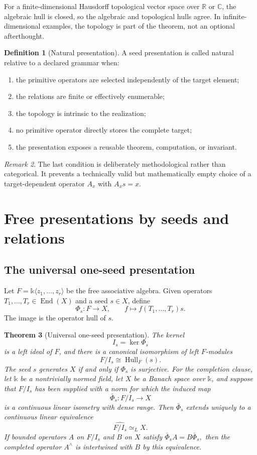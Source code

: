 \documentclass[11pt]{article}
\newtheorem{theorem}{Theorem}[section]
\theoremstyle{definition}
\newtheorem{definition}[theorem]{Definition}
\theoremstyle{remark}
\newtheorem{remark}[theorem]{Remark}
\newcommand{\Hull}{\operatorname{Hull}}
\newcommand{\End}{\operatorname{End}}
\newcommand{\bbk}{\mathbb{k}}
\newcommand{\C}{\mathbb C}
\newcommand{\R}{\mathbb R}
\begin{document}
For a finite-dimensional Hausdorff topological vector space over $\R$ or $\C$, the algebraic hull is closed, so the algebraic and topological hulls agree. In infinite-dimensional examples, the topology is part of the theorem, not an optional afterthought.

\begin{definition}[Natural presentation]
A seed presentation is called natural relative to a declared grammar when:
\begin{enumerate}[label=(\alph*)]
\item the primitive operators are selected independently of the target element;
\item the relations are finite or effectively enumerable;
\item the topology is intrinsic to the realization;
\item no primitive operator directly stores the complete target;
\item the presentation exposes a reusable theorem, computation, or invariant.
\end{enumerate}
\end{definition}

\begin{remark}
The last condition is deliberately methodological rather than categorical. It prevents a technically valid but mathematically empty choice of a target-dependent operator $A_x$ with $A_xs=x$.
\end{remark}

\section{Free presentations by seeds and relations}

\subsection{The universal one-seed presentation}

Let $F=\bbk\langle z_1,\ldots,z_r\rangle$ be the free associative algebra. Given operators $T_1,\ldots,T_r\in\End(X)$ and a seed $s\in X$, define
\[
\Phi_s:F\longrightarrow X,
\qquad
f\longmapsto f(T_1,\ldots,T_r)s.
\]
The image is the operator hull of $s$.

\begin{theorem}[Universal one-seed presentation]
\label{thm:one-seed-presentation}
The kernel
\[
I_s=\ker\Phi_s
\]
is a left ideal of $F$, and there is a canonical isomorphism of left $F$-modules
\[
{
F/I_s\cong\Hull_F(s).
}
\]
The seed $s$ generates $X$ if and only if $\Phi_s$ is surjective. For the completion clause, let $\bbk$ be a nontrivially normed field, let $X$ be a Banach space over $\bbk$, and suppose that $F/I_s$ has been supplied with a norm for which the induced map
\[
\bar\Phi_s:F/I_s\longrightarrow X
\]
is a continuous linear isometry with dense range. Then $\bar\Phi_s$ extends uniquely to a continuous linear equivalence
\[
{\widehat{F/I_s}\simeq_L X.}
\]
If bounded operators $A$ on $F/I_s$ and $B$ on $X$ satisfy
\(
\bar\Phi_sA=B\bar\Phi_s,
\)
then the completed operator $A^\wedge$ is intertwined with $B$ by this equivalence.
\end{theorem}
\end{document}
